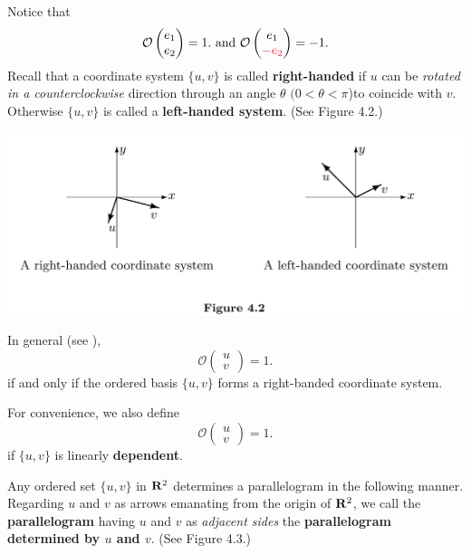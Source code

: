 \begin{additional definition} \label{adef 4.2}
Notice that
\[
    \mathcal{O} \begin{pmatrix} e_1 \\ e_2 \end{pmatrix} = 1.
    \text{ and }
    \mathcal{O} \begin{pmatrix} e_1 \\ \RED{-e_2} \end{pmatrix} = -1.
\]
Recall that a coordinate system \(\{ u, v \}\) is called \textbf{right-handed} if \(u\) can be \emph{rotated in a counterclockwise} direction through an angle \(\theta\) \((0 < \theta < \pi\))to coincide with \(v\).
Otherwise \(\{ u, v \}\) is called a \textbf{left-handed system}.
(See Figure 4.2.)

\includegraphics[width=16cm]{images/figure-4-2.png}

In general (see ),
\[
    \mathcal{O} \begin{pmatrix} u \\ v \end{pmatrix} = 1.
\]
if and only if the ordered basis \(\{ u, v \}\) forms a right-banded coordinate system.
\end{additional definition}

\begin{remark} \label{remark 4.1.3}
For convenience, we also define
\[
    \mathcal{O} \begin{pmatrix} u \\ v \end{pmatrix} = 1.
\]
if \(\{ u, v \}\) is linearly \textbf{dependent}.
\end{remark}

Any ordered set \(\{ u, v \}\) in \(\mathbf{R}^2\) determines a parallelogram in the following manner.
Regarding \(u\) and \(v\) as arrows emanating from the origin of \(\mathbf{R}^2\), we call the \textbf{parallelogram} having \(u\) and \(v\) as \emph{adjacent sides} the \textbf{parallelogram
determined by \(u\) and \(v\)}.
(See Figure 4.3.)

